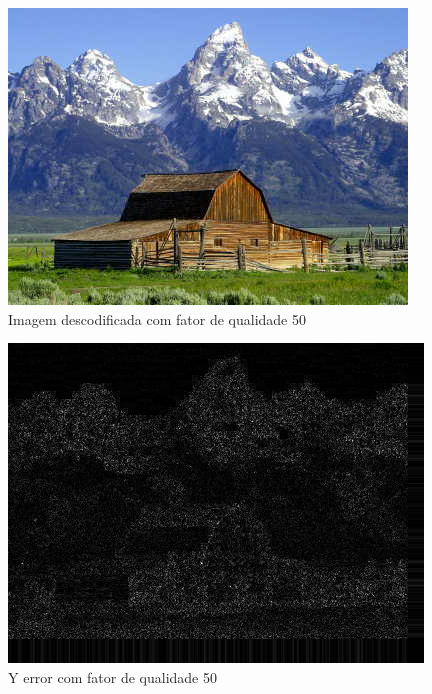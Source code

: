 \documentclass[a4paper, 12pt]{article}
\begin{document}
        \begin{multicols}{2}
            \begin{figure}[H]
                \includegraphics[width=\linewidth]{resources/DIFFS/Descodification_quality_50.png}
                \caption{\label{fig:my_label} Imagem descodificada com fator de qualidade 50}
            \end{figure}
            \begin{figure}[H]
                \includegraphics[width=\linewidth]{resources/DIFFS/Diff_Image_with_quality_50.png}
                \caption{\label{fig:my_label} Y error com fator de qualidade 50}
            \end{figure}
        \end{multicols}
\end{document}
